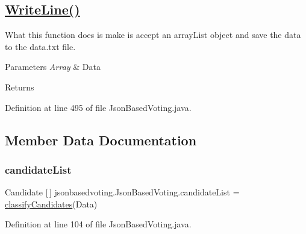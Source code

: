 \subsection*{\mbox{\hyperlink{classjsonbasedvoting_1_1_json_based_voting_a279df688d1148c7b6c9a60477ac5c268}{Write\+Line()}} }

What this function does is make is accept an array\+List object and save the data to the data.\+txt file. 
\begin{DoxyParams}{Parameters}
{\em Array} & Data \\
\hline
\end{DoxyParams}
\begin{DoxyReturn}{Returns}

\end{DoxyReturn}


Definition at line 495 of file Json\+Based\+Voting.\+java.



\subsection{Member Data Documentation}
\mbox{\label{classjsonbasedvoting_1_1_json_based_voting_aeb1c0154551e24a6fe24fc6b71576924}} 
\subsubsection{\texorpdfstring{candidateList}{candidateList}}
{\footnotesize\ttfamily Candidate \mbox{[}$\,$\mbox{]} jsonbasedvoting.\+Json\+Based\+Voting.\+candidate\+List = \mbox{\hyperlink{classjsonbasedvoting_1_1_json_based_voting_a09a09c0673c510a648d225136e4cf259}{classify\+Candidates}}(Data)\hspace{0.3cm}{\ttfamily [static]}}



Definition at line 104 of file Json\+Based\+Voting.\+java.

\mbox{\label{classjsonbasedvoting_1_1_json_based_voting_af94e2555dca7bed41989b965a179a769}} 

